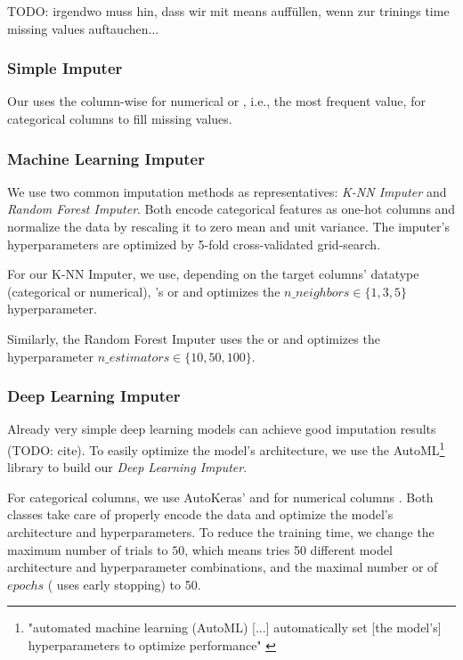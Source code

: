 TODO: irgendwo muss hin, dass wir mit means auffüllen, wenn zur trinings time missing values auftauchen...


\subsubsection{Simple Imputer}
%
Our  uses the column-wise  for numerical or , i.e., the most frequent value,  for categorical columns to fill missing values.


\subsubsection{Machine Learning Imputer}
%
We use two common imputation methods as representatives: \emph{K-NN Imputer} and \emph{Random Forest Imputer}. Both encode categorical features as one-hot columns and normalize the data by rescaling it to zero mean and unit variance. The imputer's hyperparameters are optimized by 5-fold cross-validated grid-search.

For our K-NN Imputer, we use, depending on the target columns' datatype (categorical or numerical), 's  or  and optimizes the $n\_neighbors \in \{1, 3, 5\}$  hyperparameter.

Similarly, the Random Forest Imputer uses the  or  and optimizes the hyperparameter $n\_estimators \in \{10, 50, 100\}$.


\subsubsection{Deep Learning Imputer}
%
Already very simple deep learning models can achieve good imputation results (TODO: cite). To easily optimize the model's architecture, we use the AutoML\footnote{"automated machine learning (AutoML) [...] automatically set [the model's] hyperparameters to optimize performance" \cite{AutoML}} library  \cite{AutoKeras} to build our \emph{Deep Learning Imputer}.

For categorical columns, we use AutoKeras'  and for numerical columns . Both classes take care of properly encode the data and optimize the model's architecture and hyperparameters. To reduce the training time, we change the maximum number of trials to $50$, which means  tries 50 different model architecture and hyperparameter combinations, and the maximal number or of $epochs$ ( uses early stopping) to 50.


